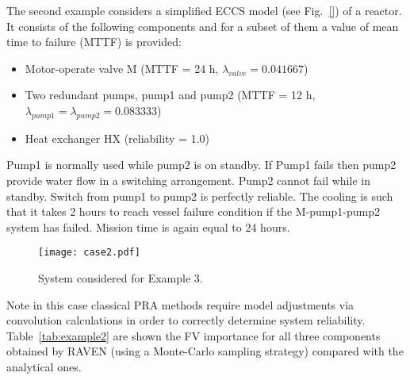 The second example considers a simplified ECCS model (see Fig.~\ref{}) of a reactor. 
It consists of the following components and for a subset of them a 
value of mean time to failure (MTTF) is provided:
\begin{itemize}
  \item Motor-operate valve M (MTTF = 24 h, $\lambda_{valve} = 0.041667$)
  \item Two redundant pumps, pump1 and pump2 
        (MTTF = 12 h, $\lambda_{pump1} = \lambda_{pump2} = 0.083333$)
  \item Heat exchanger HX (reliability = 1.0)
\end{itemize}

Pump1 is normally used while pump2 is on standby. If Pump1 fails then pump2 provide water flow 
in a switching arrangement. 
Pump2 cannot fail while in standby. Switch from pump1 to pump2 is perfectly reliable. 
The cooling is such that it takes 2 hours to reach vessel failure condition if the 
M-pump1-pump2 
system has failed. Mission time is again equal to 24 hours.

\begin{figure}
    \centering
    \centerline{\texttt{[image: case2.pdf]}}
    \caption{System considered for Example 3.}
    \label{fig:example3}
\end{figure}

Note in this case classical PRA methods require model adjustments via convolution calculations
in order to correctly 
determine system reliability.
Table~\ref{tab:example2} are shown the FV importance for all three components obtained by RAVEN (using a Monte-Carlo 
sampling strategy) compared with the analytical ones.

